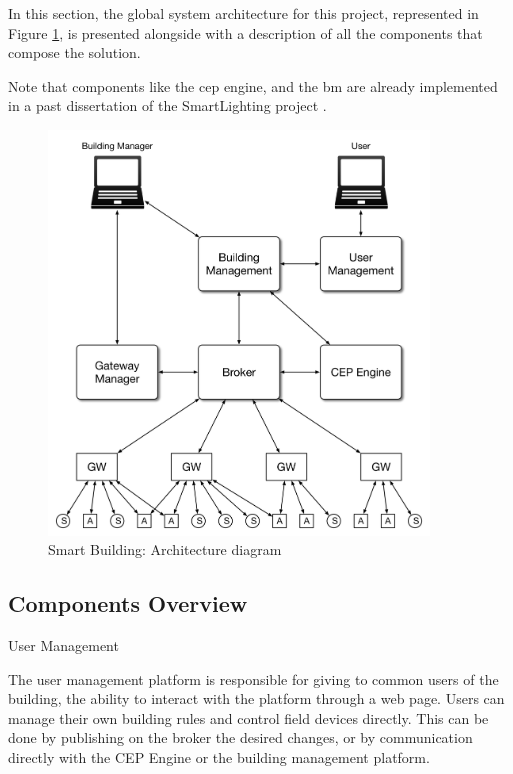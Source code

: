 In this section, the global system architecture for this project, represented in Figure \ref{fig:arch}, is presented alongside with a description of all the components that compose the solution.

Note that components like the \ac{cep} engine, and the \ac{bm} are already implemented in a past dissertation of the SmartLighting project \cite{helder}.

\begin{figure}[H]
	\centering
	\includegraphics[width=0.9\textwidth]{figures/architecture.png}
	\caption{Smart Building: Architecture diagram}
	\label{fig:arch}
\end{figure}



\subsection{Components Overview}

\begin{Paragraph}{User Management}
	
	The user management platform is responsible for giving to common users of the building, the ability to interact with the platform through a web page. Users can manage their own building rules and control field devices directly. This can be done by publishing on the broker the desired changes, or by communication directly with the CEP Engine or the building management platform.
	
\end{Paragraph}

